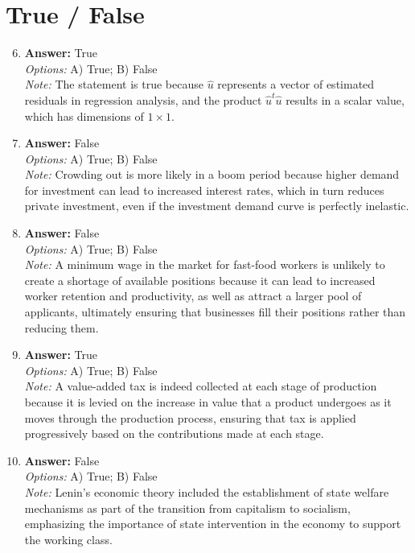 \documentclass[12pt]{article}
\begin{document}
\section*{True / False}
\begin{enumerate}[label=\arabic*.]
\setcounter{enumi}{5}
\item \textbf{Answer:} True
\\ \textit{Options:} A) True; B) False
\\ \textit{Note:} The statement is true because $\hat{u}$ represents a vector of estimated residuals in regression analysis, and the product $\hat{u}^t \hat{u}$ results in a scalar value, which has dimensions of $1 \times 1$.
\item \textbf{Answer:} False
\\ \textit{Options:} A) True; B) False
\\ \textit{Note:} Crowding out is more likely in a boom period because higher demand for investment can lead to increased interest rates, which in turn reduces private investment, even if the investment demand curve is perfectly inelastic.
\item \textbf{Answer:} False
\\ \textit{Options:} A) True; B) False
\\ \textit{Note:} A minimum wage in the market for fast-food workers is unlikely to create a shortage of available positions because it can lead to increased worker retention and productivity, as well as attract a larger pool of applicants, ultimately ensuring that businesses fill their positions rather than reducing them.
\item \textbf{Answer:} True
\\ \textit{Options:} A) True; B) False
\\ \textit{Note:} A value-added tax is indeed collected at each stage of production because it is levied on the increase in value that a product undergoes as it moves through the production process, ensuring that tax is applied progressively based on the contributions made at each stage.
\item \textbf{Answer:} False
\\ \textit{Options:} A) True; B) False
\\ \textit{Note:} Lenin's economic theory included the establishment of state welfare mechanisms as part of the transition from capitalism to socialism, emphasizing the importance of state intervention in the economy to support the working class.
\end{enumerate}
\end{document}
